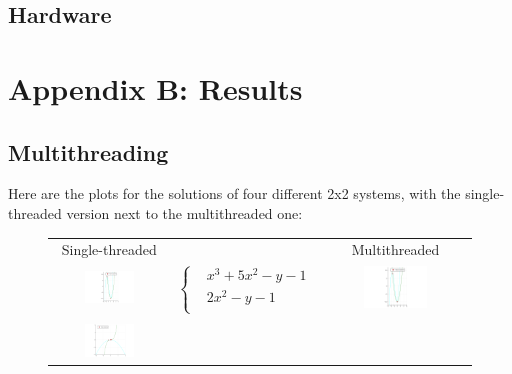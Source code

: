 \documentclass[a4paper]{article}
\theoremstyle{definition}
\theoremstyle{definition}
\theoremstyle{remark}
\theoremstyle{definition}
\begin{document}
\subsection{Hardware}
\section{Appendix B: Results}

\subsection{Multithreading}\label{sec:mt}

Here are the plots for the solutions of four different 2x2 systems, with the single-threaded version next to the multithreaded one:

\begin{figure}[htb]
    \begin{tabular}{c c c}
        Single-threaded & & Multithreaded \\
        \includegraphics[width=0.45\textwidth,valign=c]{../plots/solutions1.png} &
        $\left\{\begin{aligned}
                    &x^3 + 5x^2 - y - 1 \\
                    &2x^2 - y - 1 \\
        \end{aligned}\right.$ &
        \includegraphics[width=0.45\textwidth,valign=c]{../plots/solutions1_6.png} \\
        \vspace{0.5cm} \\
        \includegraphics[width=0.45\textwidth,valign=c]{../plots/solutions2.png} &

\end{tabular}
\end{figure}
\end{document}
